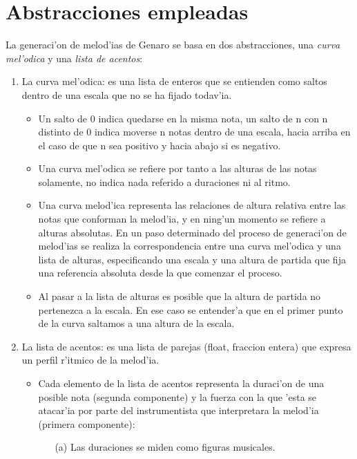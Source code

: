﻿\documentclass[a4paper,12pt]{article}
\begin{document}
\section{Abstracciones empleadas}
La generaci'on de melod'ias de Genaro se basa en dos abstracciones, una \emph{curva mel'odica} y una \emph{lista de acentos}:
        \begin{enumerate}
        \item La curva mel'odica: es una lista de enteros que se entienden como saltos dentro de una escala que no se ha fijado todav'ia.
                \begin{itemize}
                \item Un salto de 0 indica quedarse en la misma nota, un salto de n con n distinto de 0 indica moverse n notas dentro de una escala, hacia arriba en el caso de que n sea positivo y hacia abajo si es negativo.
                \item Una curva mel'odica se refiere por tanto a las alturas de las notas solamente, no indica nada referido a duraciones ni al ritmo.
                \item Una curva melod'ica representa las relaciones de altura relativa entre las notas que conforman la melod'ia, y en ning'un momento se refiere a alturas absolutas. En un paso determinado del proceso de generaci'on de melod'ias se realiza la correspondencia entre una curva mel'odica y una lista de alturas, especificando una escala y una altura de partida que fija una referencia absoluta desde la que comenzar el proceso.
                \item Al pasar a la lista de alturas es posible que la altura de partida no pertenezca a la escala. En ese caso se entender'a que en el primer punto de la curva saltamos a una altura de la escala.
                \end{itemize}
        \item La lista de acentos: es una lista de parejas (float, fraccion entera) que expresa un perfil r'itmico de la melod'ia.
                \begin{itemize}
                \item Cada elemento de la lista de acentos representa la duraci'on de una posible nota (segunda componente) y la fuerza con la que 'esta se atacar'ia por parte del instrumentista que interpretara la melod'ia (primera componente):
                        \begin{enumerate}
                        \item[(a)] Las duraciones se miden como figuras musicales.

\end{enumerate}
\end{itemize}
\end{enumerate}
\end{document}

